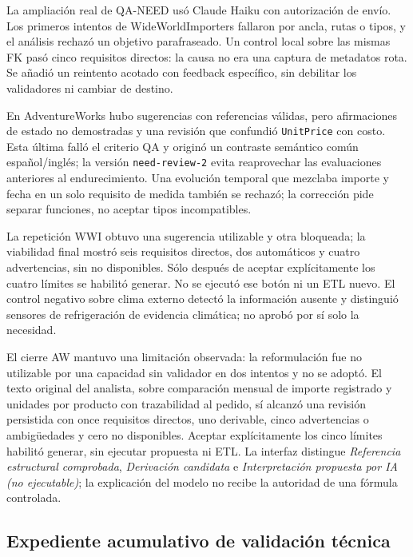 \documentclass[11pt,letterpaper]{article}
\newcommand{\file}[1]{\texttt{#1}}
\begin{document}
La ampliación real de QA-NEED usó Claude Haiku con autorización de envío. Los primeros
intentos de WideWorldImporters fallaron por ancla, rutas o tipos, y el análisis rechazó
un objetivo parafraseado. Un control local sobre las mismas FK pasó cinco requisitos
directos: la causa no era una captura de metadatos rota. Se añadió un reintento acotado
con feedback específico, sin debilitar los validadores ni cambiar de destino.

En AdventureWorks hubo sugerencias con referencias válidas, pero afirmaciones de estado
no demostradas y una revisión que confundió \file{UnitPrice} con costo. Esta última
falló el criterio QA y originó un contraste semántico común español/inglés; la versión
\file{need-review-2} evita reaprovechar las evaluaciones anteriores al endurecimiento.
Una evolución temporal que mezclaba importe y fecha en un solo requisito de medida
también se rechazó; la corrección pide separar funciones, no aceptar tipos incompatibles.

La repetición WWI obtuvo una sugerencia utilizable y otra bloqueada; la viabilidad
final mostró seis requisitos directos, dos automáticos y cuatro advertencias, sin
no disponibles. Sólo después de aceptar explícitamente los cuatro límites se habilitó
generar. No se ejecutó ese botón ni un ETL nuevo. El control negativo sobre clima
externo detectó la información ausente y distinguió sensores de refrigeración de
evidencia climática; no aprobó por sí solo la necesidad.

\begingroup
{}
El cierre AW mantuvo una limitación observada: la reformulación fue no utilizable por
una capacidad sin validador en dos intentos y no se adoptó. El texto original del
analista, sobre comparación mensual de importe registrado y unidades por producto con
trazabilidad al pedido, sí alcanzó una revisión persistida con once requisitos
directos, uno derivable, cinco advertencias o ambigüedades y cero no disponibles.
Aceptar explícitamente los cinco límites habilitó generar, sin ejecutar propuesta ni
ETL. La interfaz distingue \emph{Referencia estructural comprobada}, \emph{Derivación
candidata} e \emph{Interpretación propuesta por IA (no ejecutable)}; la explicación
del modelo no recibe la autoridad de una fórmula controlada.
\par\endgroup

\subsection{Expediente acumulativo de validación técnica}
\end{document}

